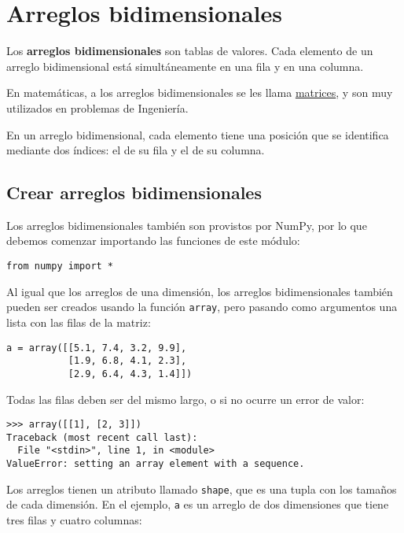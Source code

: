 \chapter{Arreglos bidimensionales}

Los \textbf{arreglos bidimensionales} son tablas de valores. Cada
elemento de un arreglo bidimensional está simultáneamente en una fila y
en una columna.

En matemáticas, a los arreglos bidimensionales se les llama
\href{http://es.wikipedia.org/wiki/Matriz\_(matem\%C3\%A1tica)}{matrices},
y son muy utilizados en problemas de Ingeniería.

En un arreglo bidimensional, cada elemento tiene una posición que se
identifica mediante dos índices: el de su fila y el de su columna.

\section{Crear arreglos bidimensionales}

Los arreglos bidimensionales también son provistos por NumPy, por lo que
debemos comenzar importando las funciones de este módulo:

\begin{lstlisting}
from numpy import *
\end{lstlisting}

Al igual que los arreglos de una dimensión, los arreglos bidimensionales
también pueden ser creados usando la función \lstinline!array!, pero
pasando como argumentos una lista con las filas de la matriz:

\begin{lstlisting}
a = array([[5.1, 7.4, 3.2, 9.9],
           [1.9, 6.8, 4.1, 2.3],
           [2.9, 6.4, 4.3, 1.4]])
\end{lstlisting}

Todas las filas deben ser del mismo largo, o si no ocurre un error de
valor:

\begin{lstlisting}
>>> array([[1], [2, 3]])
Traceback (most recent call last):
  File "<stdin>", line 1, in <module>
ValueError: setting an array element with a sequence.
\end{lstlisting}

Los arreglos tienen un atributo llamado \lstinline!shape!, que es una
tupla con los tamaños de cada dimensión. En el ejemplo, \lstinline!a! es
un arreglo de dos dimensiones que tiene tres filas y cuatro columnas:

